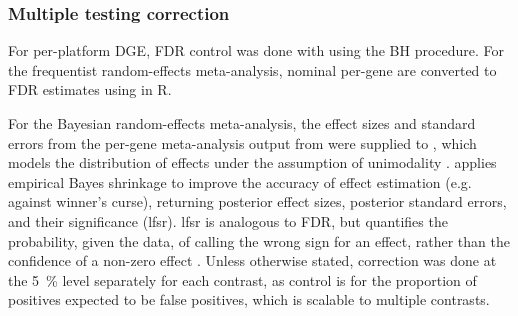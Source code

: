 \subsubsection{Multiple testing correction}
\label{subsubsec:hird_dge_multipleTestingCorrection}

%
For per-platform \gls{DGE}, \gls{FDR} control was done with  using the \gls{BH} procedure.
For the frequentist random-effects meta-analysis, nominal per-gene \pvalues{} are converted to \gls{FDR} estimates using  in R.

%
For the Bayesian random-effects meta-analysis, 
the effect sizes and standard errors from the per-gene meta-analysis output from  were supplied to ,
which models the distribution of effects under the assumption of unimodality \autocite{stephens2016FalseDiscoveryRates}.
 applies empirical Bayes shrinkage to improve the accuracy of effect estimation (e.g. against winner's curse),
returning posterior effect sizes, posterior standard errors, and their significance (\gls{lfsr}).
\gls{lfsr} is analogous to \gls{FDR}, but quantifies the probability, given the data, of calling the wrong sign for an effect,
rather than the confidence of a non-zero effect \autocite{stephens2016FalseDiscoveryRates}.
Unless otherwise stated, correction was done at the \SI{5}{\percent} level separately for each contrast,
as control is for the proportion of positives expected to be false positives,
which is scalable to multiple contrasts.

